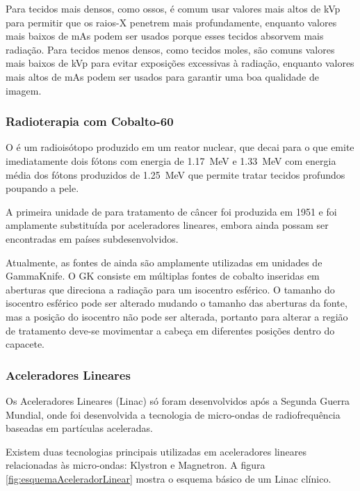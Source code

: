\documentclass[11pt,a4paper]{article}
\begin{document}
                Para tecidos mais densos, como ossos, é comum usar valores mais altos de kVp para permitir que os raios-X penetrem mais profundamente, enquanto valores mais baixos de mAs podem ser usados porque esses tecidos absorvem mais radiação. Para tecidos menos densos, como tecidos moles, são comuns valores mais baixos de kVp para evitar exposições excessivas à radiação, enquanto valores mais altos de mAs podem ser usados para garantir uma boa qualidade de imagem.


            \subsubsection{Radioterapia com Cobalto-60}

                O  é um radioisótopo produzido em um reator nuclear, que decai para o  que emite imediatamente dois fótons com energia de \qty{1.17}{MeV} e \qty{1.33}{MeV} com energia média dos fótons produzidos de \qty{1.25}{MeV} que permite tratar tecidos profundos poupando a pele.
                
                A primeira unidade de  para tratamento de câncer foi produzida em 1951 e foi amplamente substituída por aceleradores lineares, embora ainda possam ser encontradas em países subdesenvolvidos.

                Atualmente, as fontes de  ainda são amplamente utilizadas em unidades de GammaKnife. O GK consiste em múltiplas fontes de cobalto inseridas em aberturas que direciona a radiação para um isocentro esférico. O tamanho do isocentro esférico pode ser alterado mudando o tamanho das aberturas da fonte, mas a posição do isocentro não pode ser alterada, portanto para alterar a região de tratamento deve-se movimentar a cabeça em diferentes posições dentro do capacete.

            \subsubsection{Aceleradores Lineares}

                Os Aceleradores Lineares (Linac) só foram desenvolvidos após a Segunda Guerra Mundial, onde foi desenvolvida a tecnologia de micro-ondas de radiofrequência baseadas em partículas aceleradas. 

                Existem duas tecnologias principais utilizadas em aceleradores lineares relacionadas às micro-ondas: Klystron e Magnetron. A figura \ref{fig:esquemaAceleradorLinear} mostra o esquema básico de um Linac clínico.
\end{document}
